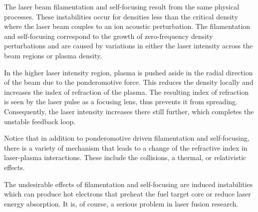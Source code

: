 The laser beam filamentation and self-focusing result from the same physical processes. These instabilities occur for densities less than the critical density where the laser beam couples to an ion acoustic perturbation. The filamentation and self-focusing correspond to the growth of zero-frequency density perturbations and are caused by variations in either the laser intensity across the beam regions or plasma density.

In the higher laser intensity region, plasma is pushed aside in the radial direction of the beam due to the ponderomotive force. This reduces the density locally and increases the index of refraction of the plasma. The resulting index of refraction is seen by the laser pulse as a focusing lens, thus prevents it from spreading. Consequently, the laser intensity increases there still further, which completes the unstable feedback loop.

Notice that in addition to ponderomotive driven filamentation and self-focusing, there is a variety of mechanism that leads to a change of the refractive index in laser-plasma interactions. These include the collisions, a thermal, or relativistic effects.

The undesirable effects of filamentation and self-focusing are induced instabilities which can produce hot electrons that preheat the fuel target core or reduce laser energy absorption. It is, of course, a serious problem in laser fusion research.